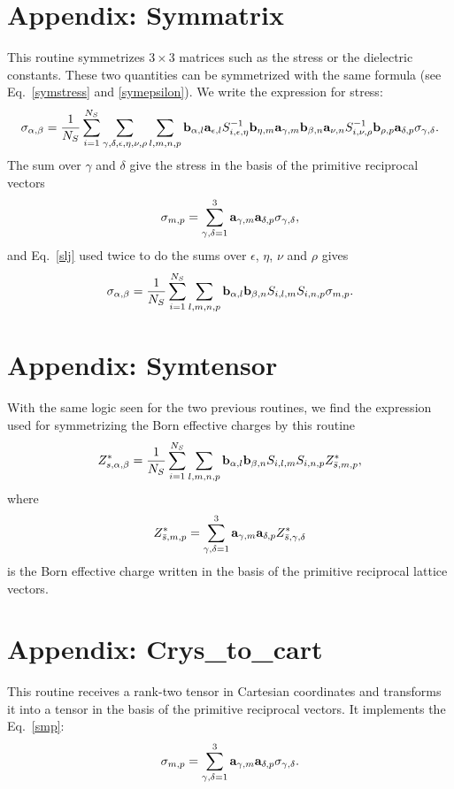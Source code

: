 \documentclass[12pt,a4paper,twoside]{report}
\begin{document}
\section{Appendix: Symmatrix}
This routine symmetrizes $3\times 3$ matrices such as the stress or the dielectric constants. These two quantities can be symmetrized with the same formula
(see Eq.~\ref{symstress} and \ref{symepsilon}).
We write the expression for stress:
\begin{equation}
\sigma_{\alpha,\beta}={1 \over N_S} \sum_{i=1}^{N_S}
\sum_{\gamma, \delta, \epsilon, \eta, \nu, \rho} \sum_{l, m, n, p} {\bf b}_{\alpha,l} {\bf a}_{\epsilon,l} S^{-1}_{i,\epsilon,\eta} {\bf b}_{\eta,m} {\bf a}_{\gamma,m} {\bf b}_{\beta,n} {\bf a}_{\nu,n} S^{-1}_{i,\nu,\rho} {\bf b}_{\rho,p} {\bf a}_{\delta,p} \sigma_{\gamma,\delta}.
\end{equation}
The sum over $\gamma$ and $\delta$ give the stress in the basis of the primitive reciprocal vectors
\begin{equation}
\sigma_{m,p}=\sum_{\gamma, \delta=1}^3
{\bf a}_{\gamma,m} {\bf a}_{\delta,p} \sigma_{\gamma,\delta},
\label{smp}
\end{equation}
and Eq.~\ref{slj} used twice to do the sums over $\epsilon$, $\eta$, $\nu$ and $\rho$ gives
\begin{equation}
\sigma_{\alpha,\beta}={1 \over N_S} \sum_{i=1}^{N_S}
 \sum_{l, m, n, p} {\bf b}_{\alpha,l} {\bf b}_{\beta,n}S_{i,l,m} S_{i,n,p} \sigma_{m,p}.
\end{equation}

\section{Appendix: Symtensor}
With the same logic seen for the two previous routines, 
we find the expression used for symmetrizing the
Born effective charges by this routine
\begin{equation}
Z^*_{s,\alpha,\beta}={1 \over N_S} \sum_{i=1}^{N_S}
 \sum_{l, m, n, p} {\bf b}_{\alpha,l} {\bf b}_{\beta,n}S_{i,l,m} S_{i,n,p} Z^*_{\bar s,m,p},
\end{equation}
where 
\begin{equation}
Z^*_{\bar s,m,p} = \sum_{\gamma, \delta=1}^3 {\bf a}_{\gamma,m} {\bf a}_{\delta,p} Z^*_{\bar s,\gamma,\delta}
\end{equation}
is the Born effective charge written in the basis of the primitive reciprocal lattice vectors.

\section{Appendix: Crys\_to\_cart}
This routine receives a rank-two tensor in Cartesian coordinates and transforms it into a tensor in the basis of the primitive reciprocal vectors. It implements the Eq.~\ref{smp}:
\begin{equation}
\sigma_{m,p}=\sum_{\gamma, \delta=1}^3
{\bf a}_{\gamma,m} {\bf a}_{\delta,p} \sigma_{\gamma,\delta}.
\end{equation}
\end{document}
